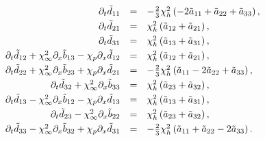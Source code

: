 \documentclass[
10pt, %
a4paper, %
oneside, %
headinclude,footinclude, %
table
]{scrartcl}
\begin{document}
\begin{remark}
$$\begin{array}{rcl}
%
\pd_{t}{\tilde{d}_{11}} &=& -  \frac{2}{3}\chi_h^2 
\left(-2\tilde{a}_{11}+\tilde{a}_{22}+\tilde{a}_{33}\right) ,\\[1mm]
%
\pd_{t}{\tilde{d}_{21}} &=& \chi _h^2\left(\tilde{a}_{12}+\tilde{a}_{21}\right) ,\\[1mm]
%
\pd_{t}{\tilde{d}_{31}} &=& \chi _h^2\left(\tilde{a}_{13}+\tilde{a}_{31}\right),\\[1mm]
%
\pd_{t}{\tilde{d}_{12}} +\chi _{\infty 
}^2\pd_{x}{\tilde{b}_{13}}-\chi _p\pd_{x}{\tilde{d}_{12}}&=& \chi _h^2 
\left(\tilde{a}_{12}+\tilde{a}_{21}\right),\\[1mm]
%
\pd_{t}{\tilde{d}_{22}} + \chi _{\infty 
}^2\pd_{x}{\tilde{b}_{23}}+\chi _p\pd_{x}{\tilde{d}_{21}}&=&-\frac{2}{3} \chi _h^2 
\left(\tilde{a}_{11}-2\tilde{a}_{22}+\tilde{a}_{33}\right),\\[1mm]
%
\pd_{t}{\tilde{d}_{32}} + \chi 
_{\infty}^2\pd_{x}{\tilde{b}_{33}}&=& \chi _h^2\left(\tilde{a}_{23}+\tilde{a}_{32}\right),\\[1mm]
%
\pd_{t}{\tilde{d}_{13}} -\chi _{\infty }^2 
\pd_{x}{\tilde{b}_{12}}-\chi _p\pd_{x}{\tilde{d}_{13}}&=& 
\chi_h^2\left(\tilde{a}_{13}+\tilde{a}_{31}\right),\\[1mm]
%
\pd_{t}{\tilde{d}_{23}} -\chi _{\infty}^2 
\pd_{x}{\tilde{b}_{22}}&=& \chi _h^2\left(\tilde{a}_{23}+\tilde{a}_{32}\right),\\[1mm]
%
\pd_{t}{\tilde{d}_{33}}  -\chi _{\infty 
}^2\pd_{x}{\tilde{b}_{32}}+\chi _p \pd_{x}{\tilde{d}_{31}}&=& -\frac{2}{3}\chi 
_h^2\left(\tilde{a}_{11}+\tilde{a}_{22}-2 \tilde{a}_{33}\right).
   \end{array}
   $$
\end{remark}
   
   
\end{document}
